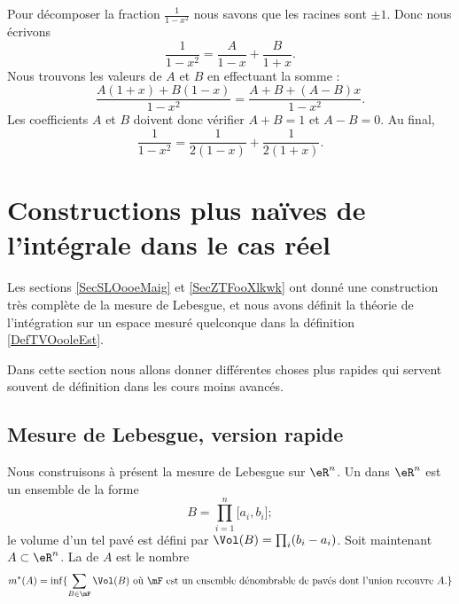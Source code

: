 \begin{example}
    Pour décomposer la fraction \( \frac{1}{ 1-x^2 }\) nous savons que les racines sont \( \pm 1\). Donc nous écrivons
    \begin{equation}
        \frac{1}{ 1-x^2 }=\frac{ A }{ 1-x }+\frac{ B }{ 1+x }.
    \end{equation}
    Nous trouvons les valeurs de \( A\) et \( B\) en effectuant la somme : 
    \begin{equation}
        \frac{ A(1+x)+B(1-x) }{ 1-x^2 }=\frac{ A+B+(A-B)x }{ 1-x^2 }.
    \end{equation}
    Les coefficients \( A\) et \( B\) doivent donc vérifier \( A+B=1\) et \( A-B=0\). Au final,
    \begin{equation}
        \frac{1}{ 1-x^2 }=\frac{1}{ 2(1-x) }+\frac{1}{ 2(1+x) }.
    \end{equation}
\end{example}

\section{Constructions plus naïves de l'intégrale dans le cas réel}

Les sections \ref{SecSLOooeMaig} et \ref{SecZTFooXlkwk} ont donné une construction très complète de la mesure de Lebesgue, et nous avons définit la théorie de l'intégration sur un espace mesuré quelconque dans la définition \ref{DefTVOooleEst}.

Dans cette section nous allons donner différentes choses plus rapides qui servent souvent de définition dans les cours moins avancés.

\subsection{Mesure de Lebesgue, version rapide}

Nous construisons à présent la mesure de Lebesgue sur \( \eR^n\). Un  dans \( \eR^n\) est un ensemble de la forme 
\begin{equation}
    B=\prod_{i=1}^n\mathopen[ a_i , b_i \mathclose];
\end{equation}
le volume d'un tel pavé est défini par \( \Vol(B)=\prod_i(b_i-a_i)\). Soit maintenant \( A\subset \eR^n\). La  de \( A\) est le nombre
\begin{equation}
    m^*(A)=\inf\{ \sum_{B\in\mF}\Vol(B)\text{ où } \mF\text{ est un ensemble dénombrable de pavés dont l'union recouvre } A\text{.} \}
\end{equation}

